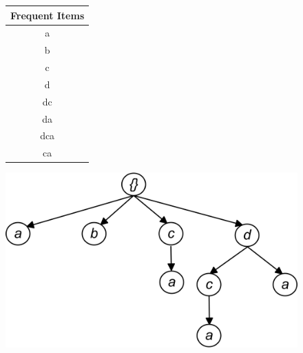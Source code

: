 %
\begin{figure}
\begin{minipage}{0.60\textwidth}
  \centering
  
	\begin{center}
	\begin{tabular}{ |c| } 
 	\hline
 		Frequent Items\\ \hline\hline
 		a \\ \hline
 		b \\ \hline
 		c \\ \hline
 		d \\ \hline
 		dc \\ \hline
 		da \\ \hline
 		dca \\ \hline
 		ca \\ \hline
\end{tabular}
\end{center}  
  
  
\end{minipage}
\hfill
\begin{minipage}{0.40\textwidth}
  \centering
  \includegraphics[width=\textwidth]{../images/frequent_tree.jpg}
\end{minipage}
\end{figure}
